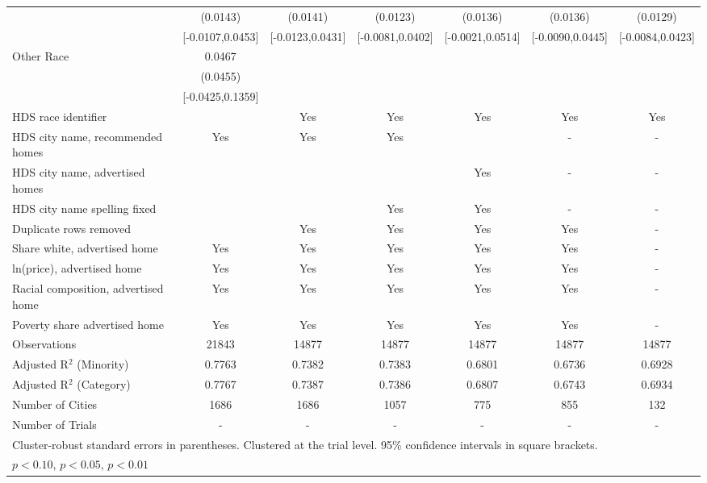 \begin{table}[htbp]
{\begin{tabular}{l*{6}{c}}
 & (0.0143) & (0.0141) & (0.0123) & (0.0136) & (0.0136) & (0.0129) \\
 & [-0.0107,0.0453] & [-0.0123,0.0431] & [-0.0081,0.0402] & [-0.0021,0.0514] & [-0.0090,0.0445] & [-0.0084,0.0423] \\
Other Race & 0.0467 &  &  &  &  &  \\
 & (0.0455) &  &  &  &  &  \\
 & [-0.0425,0.1359] &  &  &  &  &  \\
\midrule
HDS race identifier & & Yes & Yes & Yes & Yes & Yes \\
HDS city name, recommended homes & Yes & Yes & Yes & & - & -\\
HDS city name, advertised homes &  &  &  & Yes & - & -\\
HDS city name spelling fixed & & & Yes & Yes & - & -\\
Duplicate rows removed &  & Yes & Yes & Yes & Yes & - \\
\midrule
Share white, advertised home  & Yes & Yes & Yes & Yes & Yes & - \\
ln(price), advertised home  & Yes & Yes & Yes & Yes & Yes & - \\
Racial composition, advertised home & Yes & Yes & Yes & Yes & Yes & - \\
Poverty share advertised home & Yes & Yes & Yes & Yes & Yes & - \\
Observations & 21843 & 14877 & 14877 & 14877 & 14877 & 14877 \\
Adjusted R$^2$ (Minority) & 0.7763 & 0.7382 & 0.7383 & 0.6801 & 0.6736 & 0.6928 \\
Adjusted R$^2$ (Category) & 0.7767 & 0.7387 & 0.7386 & 0.6807 & 0.6743 & 0.6934 \\
Number of Cities & 1686 & 1686 & 1057 & 775 & 855 & 132 \\
Number of Trials & - & - & - & - & - & - \\
\bottomrule
\multicolumn{7}{l}{\footnotesize Cluster-robust standard errors in parentheses. Clustered at the trial level. 95\% confidence intervals in square brackets.}\\
\multicolumn{7}{l}{\footnotesize \sym{*} \(p<0.10\), \sym{**} \(p<0.05\), \sym{***} \(p<0.01\)}\\
\end{tabular}
}
\end{table}

